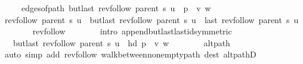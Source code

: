 \begin{isabellebody}
\ \ \ \ \ edges{\isacharunderscore}{\kern0pt}of{\isacharunderscore}{\kern0pt}path\ {\isacharparenleft}{\kern0pt}butlast\ {\isacharparenleft}{\kern0pt}rev{\isacharunderscore}{\kern0pt}follow\ {\isacharparenleft}{\kern0pt}parent\ s{\isacharparenright}{\kern0pt}\ u{\isacharparenright}{\kern0pt}\ {\isacharat}{\kern0pt}\ p\ {\isacharat}{\kern0pt}\ {\isacharbrackleft}{\kern0pt}v{\isacharcomma}{\kern0pt}\ w{\isacharbrackright}{\kern0pt}{\isacharparenright}{\kern0pt}{\isachardoublequoteclose}\isanewline
\ \ \isamarkupfalse%
\ {\isacharminus}{\kern0pt}\isanewline
\ \ \ \ \isamarkupfalse%
\ {\isachardoublequoteopen}rev{\isacharunderscore}{\kern0pt}follow\ {\isacharparenleft}{\kern0pt}parent\ s{\isacharparenright}{\kern0pt}\ u\ {\isacharequal}{\kern0pt}\ butlast\ {\isacharparenleft}{\kern0pt}rev{\isacharunderscore}{\kern0pt}follow\ {\isacharparenleft}{\kern0pt}parent\ s{\isacharparenright}{\kern0pt}\ u{\isacharparenright}{\kern0pt}\ {\isacharat}{\kern0pt}\ {\isacharbrackleft}{\kern0pt}last\ {\isacharparenleft}{\kern0pt}rev{\isacharunderscore}{\kern0pt}follow\ {\isacharparenleft}{\kern0pt}parent\ s{\isacharparenright}{\kern0pt}\ u{\isacharparenright}{\kern0pt}{\isacharbrackright}{\kern0pt}{\isachardoublequoteclose}\isanewline
\ \ \ \ \ \ \isamarkupfalse%
\ rev{\isacharunderscore}{\kern0pt}follow{\isacharparenleft}{\kern0pt}{}{\isacharparenright}{\kern0pt}\isanewline
\ \ \ \ \ \ \isamarkupfalse%
\ {\isacharparenleft}{\kern0pt}intro\ append{\isacharunderscore}{\kern0pt}butlast{\isacharunderscore}{\kern0pt}last{\isacharunderscore}{\kern0pt}id{\isacharbrackleft}{\kern0pt}symmetric{\isacharbrackright}{\kern0pt}{\isacharparenright}{\kern0pt}\isanewline
\ \ \ \ \isamarkupfalse%
\ \isamarkupfalse%
\ {\isachardoublequoteopen}{\isachardot}{\kern0pt}{\isachardot}{\kern0pt}{\isachardot}{\kern0pt}\ {\isacharequal}{\kern0pt}\ butlast\ {\isacharparenleft}{\kern0pt}rev{\isacharunderscore}{\kern0pt}follow\ {\isacharparenleft}{\kern0pt}parent\ s{\isacharparenright}{\kern0pt}\ u{\isacharparenright}{\kern0pt}\ {\isacharat}{\kern0pt}\ {\isacharbrackleft}{\kern0pt}hd\ {\isacharparenleft}{\kern0pt}p\ {\isacharat}{\kern0pt}\ {\isacharbrackleft}{\kern0pt}v{\isacharcomma}{\kern0pt}\ w{\isacharbrackright}{\kern0pt}{\isacharparenright}{\kern0pt}{\isacharbrackright}{\kern0pt}{\isachardoublequoteclose}\isanewline
\ \ \ \ \ \ \isamarkupfalse%
\ alt{\isacharunderscore}{\kern0pt}path\isanewline
\ \ \ \ \ \ \isamarkupfalse%
\ {\isacharparenleft}{\kern0pt}auto\ simp\ add{\isacharcolon}{\kern0pt}\ rev{\isacharunderscore}{\kern0pt}follow{\isacharparenleft}{\kern0pt}{}{\isacharparenright}{\kern0pt}\ walk{\isacharunderscore}{\kern0pt}between{\isacharunderscore}{\kern0pt}nonempty{\isacharunderscore}{\kern0pt}path{\isacharparenleft}{\kern0pt}{}{\isacharparenright}{\kern0pt}\ dest{\isacharcolon}{\kern0pt}\ alt{\isacharunderscore}{\kern0pt}pathD{\isacharparenleft}{\kern0pt}{}{\isacharparenright}{\kern0pt}{\isacharparenright}{\kern0pt}\isanewline

\end{isabellebody}
